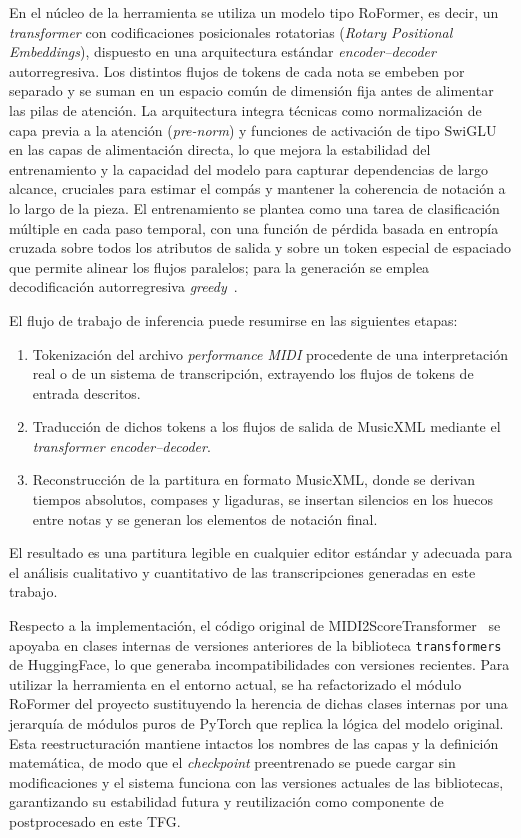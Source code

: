 \documentclass[11pt,spanish,listoffigures,listoftables]{tfgetsinf}
\begin{document}
En el núcleo de la herramienta se utiliza un modelo tipo RoFormer, es decir, un \textit{transformer} con codificaciones posicionales rotatorias
(\emph{Rotary Positional Embeddings}), dispuesto en una arquitectura estándar \emph{encoder--decoder} autorregresiva. Los distintos flujos
de tokens de cada nota se embeben por separado y se suman en un espacio común de dimensión fija antes de alimentar las pilas de atención.
La arquitectura integra técnicas como normalización de capa previa a la atención (\emph{pre-norm}) y funciones de activación de
tipo SwiGLU en las capas de alimentación directa, lo que mejora la estabilidad del entrenamiento y la capacidad del modelo para capturar
dependencias de largo alcance, cruciales para estimar el compás y mantener la coherencia de notación a lo largo de la pieza. El entrenamiento
se plantea como una tarea de clasificación múltiple en cada paso temporal, con una función de pérdida basada en entropía cruzada sobre todos
los atributos de salida y sobre un token especial de espaciado que permite alinear los flujos paralelos; para la generación se emplea
decodificación autorregresiva \emph{greedy}~\cite{beyer2024midi2score}.

El flujo de trabajo de inferencia puede resumirse en las siguientes etapas:
\begin{enumerate}
    \item Tokenización del archivo \emph{performance MIDI} procedente de una interpretación real o de un sistema de transcripción,
    extrayendo los flujos de tokens de entrada descritos.
    \item Traducción de dichos tokens a los flujos de salida de MusicXML mediante el \textit{transformer} \emph{encoder--decoder}.
    \item Reconstrucción de la partitura en formato MusicXML, donde se derivan tiempos absolutos, compases y ligaduras, se insertan
    silencios en los huecos entre notas y se generan los elementos de notación final.
\end{enumerate}

El resultado es una partitura legible en cualquier editor estándar y adecuada para el análisis cualitativo y
cuantitativo de las transcripciones generadas en este trabajo.

Respecto a la implementación, el código original de MIDI2ScoreTransformer~\cite{beyer2024midi2score} se apoyaba en clases internas de versiones
anteriores de la biblioteca \texttt{transformers} de HuggingFace, lo que generaba incompatibilidades con versiones recientes. Para utilizar
la herramienta en el entorno actual, se ha refactorizado el módulo RoFormer del proyecto sustituyendo la herencia de dichas clases internas
por una jerarquía de módulos puros de PyTorch que replica la lógica del modelo original. Esta reestructuración mantiene intactos los nombres
de las capas y la definición matemática, de modo que el \emph{checkpoint} preentrenado se puede cargar sin modificaciones y el sistema
funciona con las versiones actuales de las bibliotecas, garantizando su estabilidad futura y reutilización como componente de postprocesado en este TFG.
\end{document}

